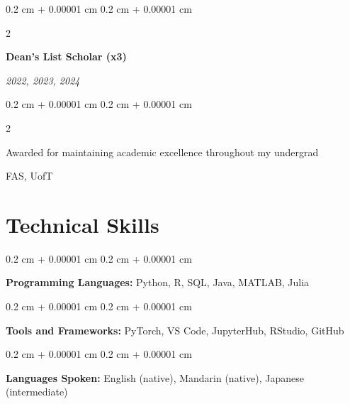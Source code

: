 \documentclass[10pt, letterpaper]{article}
\newenvironment{onecolentry}{
    \begin{adjustwidth}{
        0.2 cm + 0.00001 cm
    }{
        0.2 cm + 0.00001 cm
    }
}{
    \end{adjustwidth}
} %
\newenvironment{twocolentry}[2][]{
    \onecolentry
    \def\secondColumn{#2}
    \setcolumnwidth{\fill, 4.5 cm}
    \begin{paracol}{2}
}{
    \switchcolumn \raggedleft \secondColumn
    \end{paracol}
    \endonecolentry
} %
\begin{document}
    \vspace{0.2cm}
    \begin{twocolentry}{
        \textit{2022, 2023, 2024}
    }
        \textbf{Dean's List Scholar (x3)}
    \end{twocolentry}
    \vspace{0.1cm}
    \begin{twocolentry}
        {
            FAS, UofT
        }
        Awarded for maintaining academic excellence throughout my undergrad
    \end{twocolentry}

    \section{Technical Skills}


        \begin{onecolentry}
            \textbf{Programming Languages:} Python, R, SQL, Java, MATLAB, Julia
        \end{onecolentry}

        \vspace{0.2 cm}

        \begin{onecolentry}
            \textbf{Tools and Frameworks:} PyTorch, VS Code, JupyterHub, RStudio, GitHub
        \end{onecolentry}

        \vspace{0.2cm}
        \begin{onecolentry}
            \textbf{Languages Spoken:} English (native), Mandarin (native), Japanese (intermediate)
        \end{onecolentry}

    
\end{document}
